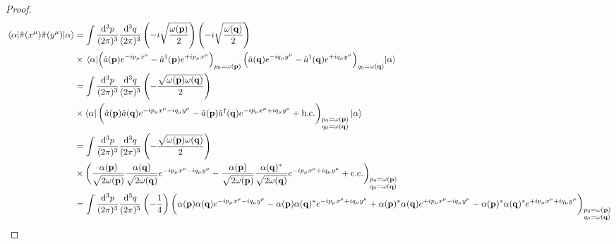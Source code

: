 \begin{proof}
	\begin{equation*}
		\begin{split}
			\expval{\hat\pi(x^\mu)\hat\pi(y^\mu)}{\alpha}
			&=
			\int\frac{\dd[3]{p}}{(2\pi)^3}\frac{\dd[3]{q}}{(2\pi)^3}
			\left(
				-i
				\sqrt{\frac{\omega(\vb{p})}{2}}
			\right)
			\left(
				-i
				\sqrt{\frac{\omega(\vb{q})}{2}}
			\right)
			\\
			&\times
			\expval{
				\left(
					\hat{a}(\vb{p})
					e^{-ip_\mu x^\mu}
					-
					\hat{a}^\dagger(\vb{p})
					e^{+ip_\mu x^\mu}
				\right)_{p_0=\omega(\vb{p})}
				\left(
					\hat{a}(\vb{q})
					e^{-iq_\mu y^\mu}
					-
					\hat{a}^\dagger(\vb{q})
					e^{+iq_\mu y^\mu}
				\right)_{q_0=\omega(\vb{q})}
			}{\alpha}
			\\
			&=
			\int\frac{\dd[3]{p}}{(2\pi)^3}\frac{\dd[3]{q}}{(2\pi)^3}
			\left(
				-
				\frac{\sqrt{\omega(\vb{p})\omega(\vb{q})}}{2}
			\right)
			\\
			&\times
			\bra{\alpha}
			\biggl(
				\hat{a}(\vb{p})
				\hat{a}(\vb{q})
				e^{-ip_\mu x^\mu-iq_\mu y^\mu}
				-
				\hat{a}(\vb{p})
				\hat{a}^\dagger(\vb{q})
				e^{-ip_\mu x^\mu+iq_\mu y^\mu}
				+
				\text{h.c.}
			\biggr)_{\substack{p_0=\omega(\vb{p})\\q_0=\omega(\vb{q})}}
			\ket{\alpha}
			\\
			&=
			\int\frac{\dd[3]{p}}{(2\pi)^3}\frac{\dd[3]{q}}{(2\pi)^3}
			\left(
				-
				\frac{\sqrt{\omega(\vb{p})\omega(\vb{q})}}{2}
			\right)
			\\
			&\times
			\biggl(
				\frac{\alpha(\vb{p})}{\sqrt{2\omega(\vb{p})}}
				\frac{\alpha(\vb{q})}{\sqrt{2\omega(\vb{q})}}
				e^{-ip_\mu x^\mu-iq_\mu y^\mu}
				-
				\frac{\alpha(\vb{p})}{\sqrt{2\omega(\vb{p})}}
				\frac{\alpha(\vb{q})^*}{\sqrt{2\omega(\vb{q})}}
				e^{-ip_\mu x^\mu+iq_\mu y^\mu}
				+
				\text{c.c.}
			\biggr)_{\substack{p_0=\omega(\vb{p})\\q_0=\omega(\vb{q})}}
			\\
			&=
			\int\frac{\dd[3]{p}}{(2\pi)^3}\frac{\dd[3]{q}}{(2\pi)^3}
			\left(
				-
				\frac{1}{4}
			\right)
			\biggl(
				\alpha(\vb{p})
				\alpha(\vb{q})
				e^{-ip_\mu x^\mu-iq_\mu y^\mu}
				-
				\alpha(\vb{p})
				\alpha(\vb{q})^*
				e^{-ip_\mu x^\mu+iq_\mu y^\mu}
				+
				\alpha(\vb{p})^*
				\alpha(\vb{q})
				e^{+ip_\mu x^\mu-iq_\mu y^\mu}
				-
				\alpha(\vb{p})^*
				\alpha(\vb{q})^*
				e^{+ip_\mu x^\mu+iq_\mu y^\mu}
			\biggr)_{\substack{p_0=\omega(\vb{p})\\q_0=\omega(\vb{q})}}
		\end{split}
	\end{equation*}
\end{proof}